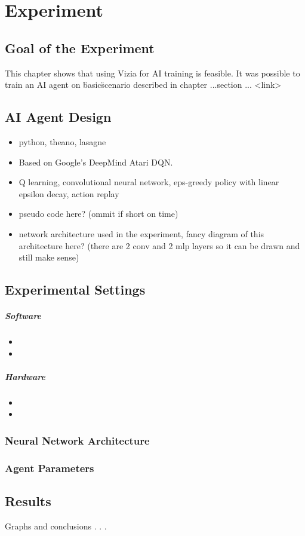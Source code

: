 \chapter{Experiment}

\section{Goal of the Experiment}
This chapter shows that using Vizia for AI training is feasible. It was possible to train an AI agent on \"basic\" scenario described in chapter ...section ... <link> 

\section{AI Agent Design}
\begin{itemize}
\item python, theano, lasagne
\item Based on Google's DeepMind Atari DQN.
\item Q learning, convolutional neural network, eps-greedy policy with linear epsilon decay, action replay
\item pseudo code here? (ommit if short on time)
\item network architecture used in the experiment, fancy diagram of this architecture here? (there are 2 conv and 2 mlp layers so it can be drawn and still make sense)
\end{itemize}

\section{Experimental Settings} 

	\paragraph{Software}
	\begin{itemize}
		\item
		\item
	\end{itemize}

	\paragraph{Hardware}
	\begin{itemize}
		\item
		\item
	\end{itemize}

	\subsection{Neural Network Architecture}
	
	\subsection{Agent Parameters}

\section{Results}
Graphs and conclusions . . .